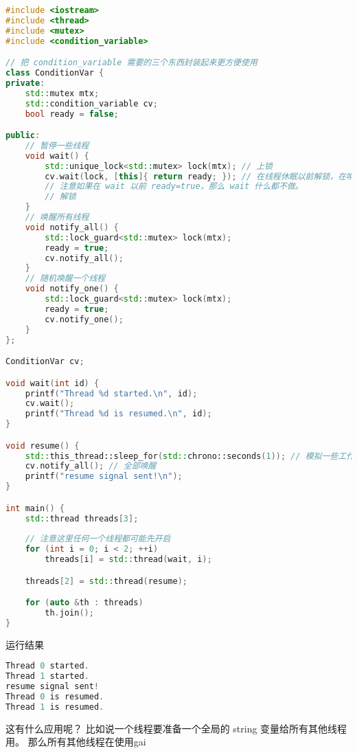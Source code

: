 \begin{lstlisting}[language=cpp]
#include <iostream>
#include <thread>
#include <mutex>
#include <condition_variable>

// 把 condition_variable 需要的三个东西封装起来更方便使用
class ConditionVar {
private:
    std::mutex mtx;
    std::condition_variable cv;
    bool ready = false;

public:
    // 暂停一些线程
    void wait() {
        std::unique_lock<std::mutex> lock(mtx); // 上锁
        cv.wait(lock, [this]{ return ready; }); // 在线程休眠以前解锁，在唤醒时再次上锁
        // 注意如果在 wait 以前 ready=true，那么 wait 什么都不做。
        // 解锁
    }
    // 唤醒所有线程
    void notify_all() {
        std::lock_guard<std::mutex> lock(mtx);
        ready = true;
        cv.notify_all();
    }
    // 随机唤醒一个线程
    void notify_one() {
        std::lock_guard<std::mutex> lock(mtx);
        ready = true;
        cv.notify_one();
    }
};

ConditionVar cv;

void wait(int id) {
	printf("Thread %d started.\n", id);
    cv.wait();
	printf("Thread %d is resumed.\n", id);
}

void resume() {
    std::this_thread::sleep_for(std::chrono::seconds(1)); // 模拟一些工作
    cv.notify_all(); // 全部唤醒
    printf("resume signal sent!\n");
}

int main() {
    std::thread threads[3];
    
    // 注意这里任何一个线程都可能先开启
    for (int i = 0; i < 2; ++i)
        threads[i] = std::thread(wait, i);

    threads[2] = std::thread(resume);

    for (auto &th : threads)
        th.join();
}
\end{lstlisting}
运行结果
\begin{lstlisting}[language=cpp]
Thread 0 started.
Thread 1 started.
resume signal sent!
Thread 0 is resumed.
Thread 1 is resumed.
\end{lstlisting}

这有什么应用呢？ 比如说一个线程要准备一个全局的 string 变量给所有其他线程用。 那么所有其他线程在使用gai
